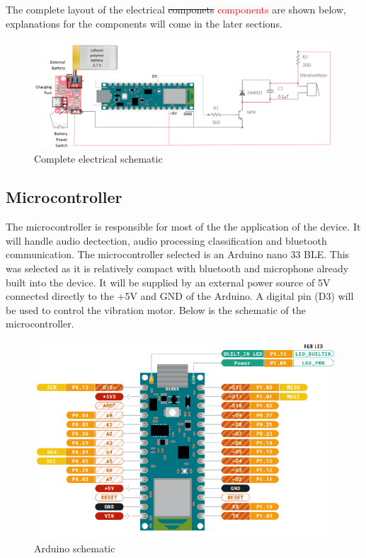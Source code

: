 \documentclass[12pt, titlepage]{article}
\begin{document}
\noindent The complete layout of the electrical \sout{componets} \textcolor{red}{components} are shown below, explanations for the components will come in the later sections.
\begin{figure}[H]
\centering
  \includegraphics[width=\textwidth,height=\textheight,keepaspectratio]{Schematic.png}
  \caption{Complete electrical schematic}
  \label{schematic} 
\end{figure}

\subsection{Microcontroller}
The microcontroller is responsible for most of the the application of the device. It will handle audio dectection, audio processing classification and bluetooth communication. The microcontroller selected is an Arduino nano 33 BLE. This was selected as it is relatively compact with bluetooth and microphone already built into the device. It will be supplied by an external power source of 5V connected directly to the +5V and GND of the Arduino. A digital pin (D3) will be used to control the vibration motor. Below is the schematic of the microcontroller.
 \begin{figure}[H]
\centering
  \includegraphics[width=\textwidth,height=\textheight,keepaspectratio]{NanoSchematic.png}
  \caption{Arduino schematic}
  \label{Nanoschematic} 
\end{figure}
\end{document}
